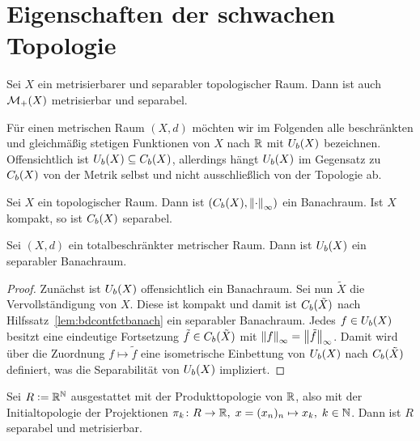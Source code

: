 \documentclass[../main/main.tex]{subfiles}
\begin{document}
	\section{Eigenschaften der schwachen Topologie}
	
	\begin{Satz}
		\label{thm:finitemeasuresmetrizableseparable}
		Sei $X$ ein metrisierbarer und separabler topologischer Raum. Dann ist auch $\mathcal{M}_{+}(X)$ metrisierbar und separabel.
	\end{Satz}

	Für einen metrischen Raum $(X, d)$ möchten wir im Folgenden alle beschränkten und gleichmäßig stetigen Funktionen von $X$ nach $\mathbb{R}$ mit 
	$U_b(X)$ bezeichnen. Offensichtlich ist $U_b(X) \subseteq C_b(X)$, allerdings hängt $U_b(X)$ im Gegensatz zu $C_b(X)$ von der Metrik selbst
	und nicht ausschließlich von der Topologie ab.
	
	\begin{Hilfssatz}
		\label{lem:bdcontfctbanach}
		Sei $X$ ein topologischer Raum. Dann ist $(C_b(X), \left\lVert\cdot\right\rVert_\infty)$ ein Banachraum. Ist $X$ kompakt, so ist $C_b(X)$ separabel.
	\end{Hilfssatz}
	
	\begin{Hilfssatz}
		\label{lem:bduniffctbanach}
		Sei $(X, d)$ ein totalbeschränkter metrischer Raum. Dann ist $U_b(X)$ ein separabler Banachraum.
	\end{Hilfssatz}

	\begin{proof}
		Zunächst ist $U_b(X)$ offensichtlich ein Banachraum.
		Sei nun $\tilde{X}$ die Vervollständigung von $X$. Diese ist kompakt und damit ist $C_b(\tilde{X})$ nach Hilfssatz~\ref{lem:bdcontfctbanach} ein separabler Banachraum.
		Jedes $f \in U_b(X)$ besitzt eine eindeutige Fortsetzung $\tilde{f} \in C_b(\tilde{X})$ mit $\left\lVert f\right\rVert_\infty = \left\lVert\tilde{f}\right\rVert_\infty$. Damit wird über die Zuordnung
		$f \mapsto \tilde{f}$ eine isometrische Einbettung von $U_b(X)$ nach $C_b(\tilde{X})$ definiert, was die Separabilität von $U_b(X)$ impliziert.
	\end{proof}

	\begin{Hilfssatz}
		Sei $R \vcentcolon = \mathbb{R}^{\mathbb{N}}$ ausgestattet mit der Produkttopologie von $\mathbb{R}$, also mit der Initialtopologie der Projektionen $\pi_k \colon R \to \mathbb{R}, \; x = (x_n)_n \mapsto x_k , \; k \in \mathbb{N}$. Dann ist $R$ 
		separabel und metrisierbar.
	\end{Hilfssatz}
\end{document}
